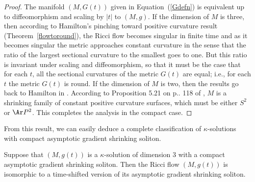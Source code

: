 \begin{proof} The
manifold $(M,G(t))$ given in Equation~(\ref{Gdefn}) is equivalent up to
diffeomorphism and scaling by $|t|$ to $(M,g)$. If the dimension of $M$ is
three, then according to Hamilton's pinching toward positive curvature result
(Theorem~\ref{flowtoround}), the Ricci flow becomes singular in finite time and
as it becomes singular the metric approaches constant curvature in the sense
that the ratio of the largest sectional curvature to the smallest goes to one.
But this ratio is invariant under scaling and diffeomorphism, so that it must
be the case that for each $t$, all the sectional curvatures of the metric
$G(t)$ are equal; i.e., for each $t$ the metric $G(t)$ is round. If the
dimension of $M$ is two, then the results go back to Hamilton in
\cite{Hamiltonsurface}. According to Proposition 5.21 on p.. 118 of
\cite{ChowKnopf}, $M$ is a shrinking family of constant positive curvature
surfaces, which must be either $S^2$ or $\Ar P^2$. This completes the analysis
in the compact case.
\end{proof}


From this result, we can easily deduce a complete classification of
$\kappa$-solutions with compact asymptotic gradient shrinking
soliton.



\begin{corollary}\label{cor:compact-asymptotic-soliton-classification}
\label{compactcase}
Suppose that $(M,g(t))$ is a $\kappa$-solution of dimension $3$ with a compact
asymptotic gradient shrinking soliton. Then the Ricci flow $(M,g(t))$ is
isomorphic to a time-shifted version of its asymptotic gradient shrinking
soliton.
\end{corollary}

